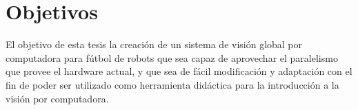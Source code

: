 
\section{Objetivos}

El objetivo de esta tesis la creación de un sistema de visión global por
computadora para fútbol de robots que sea capaz de aprovechar el paralelismo que
provee el hardware actual, y que sea de fácil modificación y adaptación con el
fin de poder ser utilizado como herramienta didáctica para la introducción a la
visión por computadora.
